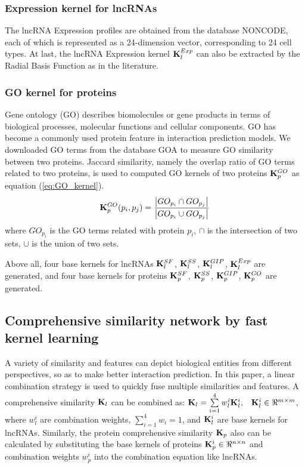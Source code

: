 \documentclass[fleqn,10pt]{wlscirep}
\begin{document}
\subsubsection*{Expression kernel for lncRNAs}
The lncRNA Expression profiles are obtained from the database NONCODE, each of which is represented as a 24-dimension vector, corresponding to 24 cell types. At last, the lncRNA Expression kernel ${\bf{K}}_l^{Exp}$ can also be extracted by the Radial Basis Function as in the literature\cite{Buhmann2004}.

\subsubsection*{GO kernel for proteins}
Gene ontology (GO) describes biomolecules or gene products in terms of biological processes, molecular functions and cellular components. GO has become a commonly used protein feature in interaction prediction models. We downloaded GO terms from the database GOA\cite{Wan2013} to measure GO similarity between two proteins. Jaccard similarity, namely the overlap ratio of GO terms related to two proteins, is used to computed GO kernels of two proteins ${\bf{K}}_p^{GO}$ as equation (\ref{eq:GO_kernel}).
\begin{equation}\label{eq:GO_kernel}
{\bf{K}}_p^{GO}({p_i},{p_j}) = \frac{{\left| {G{O_{{p_i}}} \cap G{O_{{p_j}}}} \right|}}{{\left| {G{O_{{p_i}}} \cup G{O_{{p_j}}}} \right|}}
\end{equation}
where ${G{O_{{p_i}}}}$ is the GO terms related with protein ${p_i}$, $ \cap $ is the intersection of two sets, $ \cup $ is the union of two sets.

Above all, four base kernels for lncRNAs ${\bf{K}}_l^{SF}$, ${\bf{K}}_l^{SS}$, ${\bf{K}}_l^{GIP}$, ${\bf{K}}_l^{Exp}$ are generated, and four base kernels for proteins ${\bf{K}}_p^{SF}$, ${\bf{K}}_p^{SS}$, ${\bf{K}}_p^{GIP}$, ${\bf{K}}_p^{GO}$ are generated.

\subsection*{Comprehensive similarity network by fast kernel learning}
A variety of similarity and features can depict biological entities from different perspectives, so as to make better interaction prediction. In this paper, a linear combination strategy is used to quickly fuse multiple similarities and features\cite{He2008,Shen2019}. A comprehensive  similarity ${{\bf{K}}_l}$ can be combined as: ${{\bf{K}}_l} = \sum\limits_{i = 1}^4 {w_l^i} {\bf{K}}_l^i,\;\;\;{\bf{K}}_l^i \in {\Re ^{m \times m}}$, where ${w_l^i}$ are combination weights, $\sum\limits_{i = 1}^4 {{w_i}}=1$, and ${\bf{K}}_l^i$ are base kernels for lncRNAs. Similarly, the protein comprehensive similarity ${{\bf{K}}_p}$ also can be calculated by substituting the base kernels of proteins ${\bf{K}}_p^i \in {\Re ^{n \times n}}$ and combination weights ${w_p^i}$ into the combination equation like lncRNAs. 
\end{document}

